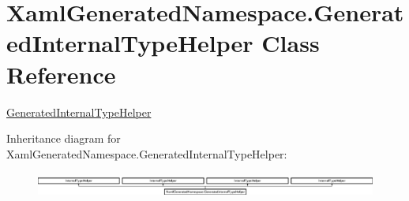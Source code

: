 \hypertarget{class_xaml_generated_namespace_1_1_generated_internal_type_helper}{}\section{Xaml\+Generated\+Namespace.\+Generated\+Internal\+Type\+Helper Class Reference}
\label{class_xaml_generated_namespace_1_1_generated_internal_type_helper}


\mbox{\hyperlink{class_xaml_generated_namespace_1_1_generated_internal_type_helper}{Generated\+Internal\+Type\+Helper}}  


Inheritance diagram for Xaml\+Generated\+Namespace.\+Generated\+Internal\+Type\+Helper\+:\begin{figure}[H]
\begin{center}
\leavevmode
\includegraphics[height=0.813953cm]{dc/db0/class_xaml_generated_namespace_1_1_generated_internal_type_helper}
\end{center}
\end{figure}
